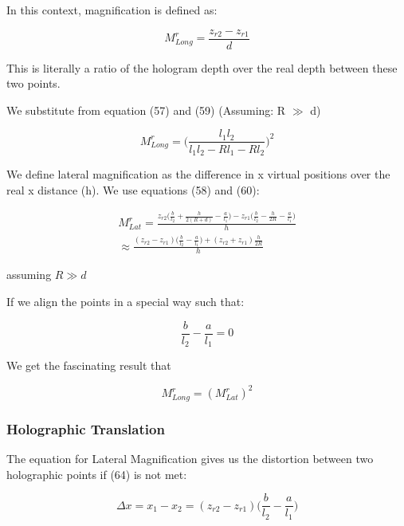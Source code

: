 \documentclass[12pt]{article}
\begin{document}
In this context, magnification is defined as:

\begin{equation}
	M_{Long}^r = \frac{z_{r2} - z_{r1}}{d}
\end{equation}

This is literally a ratio of the hologram depth over the real depth between these two points.

We substitute from equation (57) and (59) (Assuming: R \(\gg\) d)

\begin{equation}
	M_{Long}^r = \bigg(\frac{l_{1}l_{2}}{l_{1}l_{2} - Rl_{1} - Rl_{2}}\bigg)^2
\end{equation}

We define lateral magnification as the difference in x virtual positions over the real x distance (h). We use equations (58) and (60):

\begin{equation}
	\begin{multlined}
		M_{Lat}^r = \frac{z_{r2}\bigg( \frac{b}{l_{2}} + \frac{h}{2(R + d)} - \frac{a}{l_{1}}\bigg) - z_{r1}\bigg(\frac{b}{l_{2}} - \frac{h}{2R} - \frac{a}{l_{1}} \bigg)}{h}
		\\\approx \frac{(z_{r2} - z_{r1})\bigg(\frac{b}{l_{2}} -\frac{a}{l_{1}} \bigg) + (z_{r2} + z_{r1})\frac{h}{2R}}{h}
	\end{multlined}
\end{equation}

assuming \(R \gg d\)

If we align the points in a special way such that:

\begin{equation}
	\frac{b}{l_{2}} - \frac{a}{l_{1}} = 0
\end{equation}

We get the fascinating result that

\begin{equation}
	M_{Long}^r = (M_{Lat}^r)^2
\end{equation}

\subsubsection{Holographic Translation}

The equation for Lateral Magnification gives us the distortion between two holographic points if (64) is not met:

\begin{equation}
	\Delta x = x_{1} - x_{2} = (z_{r2} - z_{r1})\bigg(\frac{b}{l_{2}} - \frac{a}{l_{1}}\bigg)
\end{equation}
\end{document}

